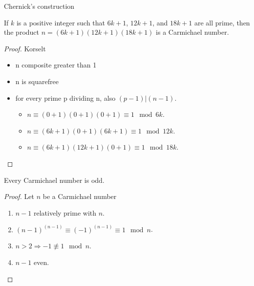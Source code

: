\documentclass{beamer}
\begin{document}
\begin{frame}{Chernick's construction}
    \begin{corollary}
        If $k$ is a positive integer such that $6k + 1$, $12k + 1$, and $18k + 1$ are all prime,
then the product $n = (6k + 1)(12k + 1)(18k + 1)$ is a Carmichael number.
    \end{corollary}
    \pause\begin{proof}
        Korselt
        \pause
        \begin{itemize}
            \item n composite greater than 1
            \pause\item n is squarefree
            \pause\item for every prime p dividing n, also $(p - 1) | (n - 1)$.
            \pause\begin{itemize}
                \item $n\equiv (0+1)(0+1)(0+1)\equiv 1 \mod 6k$.
                \item $n\equiv (6k+1)(0+1)(6k+1)\equiv 1 \mod 12k$.
                \item $n\equiv (6k+1)(12k+1)(0+1)\equiv 1 \mod 18k$.
            \end{itemize}
        \end{itemize}
    \end{proof}
\end{frame}

\begin{frame}
    \begin{lemma}
        Every Carmichael number is odd.
    \end{lemma}
    \begin{proof}
        Let $n$ be a Carmichael number
        \pause\begin{enumerate}
            \item $n-1$ relatively prime with $n$.
            \pause\item $(n-1)^{(n-1)}\equiv (-1)^{(n-1)} \equiv 1 \mod n$.
            \pause\item $n>2\Rightarrow -1 \not\equiv 1 \mod n$.
            \pause\item $n-1$ even.
        \end{enumerate}
    \end{proof}
\end{frame}
\end{document}
